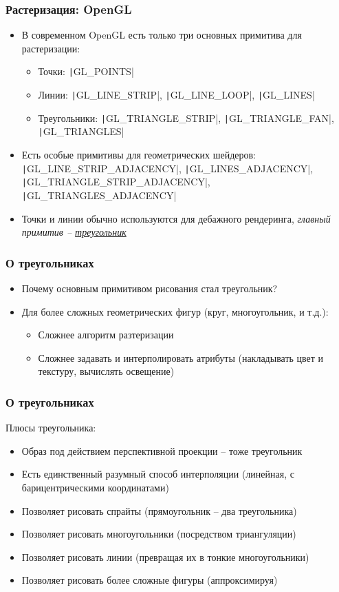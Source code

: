 \documentclass[10pt]{beamer}
\begin{document}
\begin{frame}[fragile]
\frametitle{Растеризация: OpenGL}
\begin{itemize}
\item В современном OpenGL есть только три основных примитива для растеризации:
\pause
\begin{itemize}
\item Точки: \texttt|GL_POINTS|
\pause
\item Линии: \texttt|GL_LINE_STRIP|, \texttt|GL_LINE_LOOP|, \texttt|GL_LINES|
\pause
\item Треугольники: \texttt|GL_TRIANGLE_STRIP|, \texttt|GL_TRIANGLE_FAN|, \texttt|GL_TRIANGLES|
\end{itemize}
\pause
\item Есть особые примитивы для геометрических шейдеров: \texttt|GL_LINE_STRIP_ADJACENCY|, \texttt|GL_LINES_ADJACENCY|, \texttt|GL_TRIANGLE_STRIP_ADJACENCY|, \texttt|GL_TRIANGLES_ADJACENCY|
\pause
\item Точки и линии обычно используются для дебажного рендеринга, \textit{главный примитив -- \underline{треугольник}}
\end{itemize}
\end{frame}

\begin{frame}
\frametitle{О треугольниках}
\begin{itemize}
\item Почему основным примитивом рисования стал треугольник?
\pause
\item Для более сложных геометрических фигур (круг, многоугольник, и т.д.):
\pause
\begin{itemize}
\item Сложнее алгоритм разтеризации
\pause
\item Сложнее задавать и интерполировать атрибуты (накладывать цвет и текстуру, вычислять освещение)
\end{itemize}
\end{itemize}
\end{frame}

\begin{frame}
\frametitle{О треугольниках}
Плюсы треугольника:
\pause
\begin{itemize}
\item Образ под действием перспективной проекции -- тоже треугольник
\pause
\item Есть единственный разумный способ интерполяции (линейная, с барицентрическими координатами)
\pause
\item Позволяет рисовать спрайты (прямоугольник -- два треугольника)
\pause
\item Позволяет рисовать многоугольники (посредством триангуляции)
\pause
\item Позволяет рисовать линии (превращая их в тонкие многоугольники)
\pause
\item Позволяет рисовать более сложные фигуры (аппроксимируя)
\end{itemize}
\end{frame}
\end{document}
